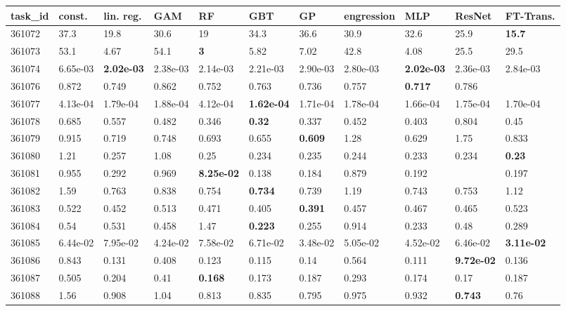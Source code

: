 \begin{table}[ht!]
\centering
\begingroup\footnotesize
\begin{tabular}{lllllllllll}
  \hline
\hline
task\_id & const. & lin. reg. & GAM & RF & GBT & GP & engression & MLP & ResNet & FT-Trans. \\ 
  \hline
361072 & 37.3 & 19.8 & 30.6 & 19 & 34.3 & 36.6 & 30.9 & 32.6 & 25.9 & \textbf{15.7} \\ 
  361073 & 53.1 & 4.67 & 54.1 & \textbf{3} & 5.82 & 7.02 & 42.8 & 4.08 & 25.5 & 29.5 \\ 
  361074 & 6.65e-03 & \textbf{2.02e-03} & 2.38e-03 & 2.14e-03 & 2.21e-03 & 2.90e-03 & 2.80e-03 & \textbf{2.02e-03} & 2.36e-03 & 2.84e-03 \\ 
  361076 & 0.872 & 0.749 & 0.862 & 0.752 & 0.763 & 0.736 & 0.757 & \textbf{0.717} & 0.786 &  \\ 
  361077 & 4.13e-04 & 1.79e-04 & 1.88e-04 & 4.12e-04 & \textbf{1.62e-04} & 1.71e-04 & 1.78e-04 & 1.66e-04 & 1.75e-04 & 1.70e-04 \\ 
  361078 & 0.685 & 0.557 & 0.482 & 0.346 & \textbf{0.32} & 0.337 & 0.452 & 0.403 & 0.804 & 0.45 \\ 
  361079 & 0.915 & 0.719 & 0.748 & 0.693 & 0.655 & \textbf{0.609} & 1.28 & 0.629 & 1.75 & 0.833 \\ 
  361080 & 1.21 & 0.257 & 1.08 & 0.25 & 0.234 & 0.235 & 0.244 & 0.233 & 0.234 & \textbf{0.23} \\ 
  361081 & 0.955 & 0.292 & 0.969 & \textbf{8.25e-02} & 0.138 & 0.184 & 0.879 & 0.192 &  & 0.197 \\ 
  361082 & 1.59 & 0.763 & 0.838 & 0.754 & \textbf{0.734} & 0.739 & 1.19 & 0.743 & 0.753 & 1.12 \\ 
  361083 & 0.522 & 0.452 & 0.513 & 0.471 & 0.405 & \textbf{0.391} & 0.457 & 0.467 & 0.465 & 0.523 \\ 
  361084 & 0.54 & 0.531 & 0.458 & 1.47 & \textbf{0.223} & 0.255 & 0.914 & 0.233 & 0.48 & 0.289 \\ 
  361085 & 6.44e-02 & 7.95e-02 & 4.24e-02 & 7.58e-02 & 6.71e-02 & 3.48e-02 & 5.05e-02 & 4.52e-02 & 6.46e-02 & \textbf{3.11e-02} \\ 
  361086 & 0.843 & 0.131 & 0.408 & 0.123 & 0.115 & 0.14 & 0.564 & 0.111 & \textbf{9.72e-02} & 0.136 \\ 
  361087 & 0.505 & 0.204 & 0.41 & \textbf{0.168} & 0.173 & 0.187 & 0.293 & 0.174 & 0.17 & 0.187 \\ 
  361088 & 1.56 & 0.908 & 1.04 & 0.813 & 0.835 & 0.795 & 0.975 & 0.932 & \textbf{0.743} & 0.76 \\ 

\end{tabular}
\end{table}
